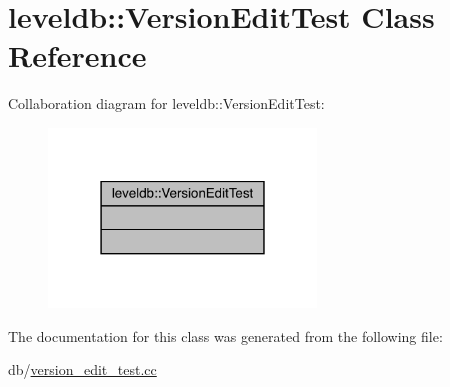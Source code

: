\hypertarget{classleveldb_1_1_version_edit_test}{}\section{leveldb\+::Version\+Edit\+Test Class Reference}
\label{classleveldb_1_1_version_edit_test}


Collaboration diagram for leveldb\+::Version\+Edit\+Test\+:
\nopagebreak
\begin{figure}[H]
\begin{center}
\leavevmode
\includegraphics[width=202pt]{classleveldb_1_1_version_edit_test__coll__graph}
\end{center}
\end{figure}


The documentation for this class was generated from the following file\+:\begin{DoxyCompactItemize}
\item 
db/\mbox{\hyperlink{version__edit__test_8cc}{version\+\_\+edit\+\_\+test.\+cc}}\end{DoxyCompactItemize}
